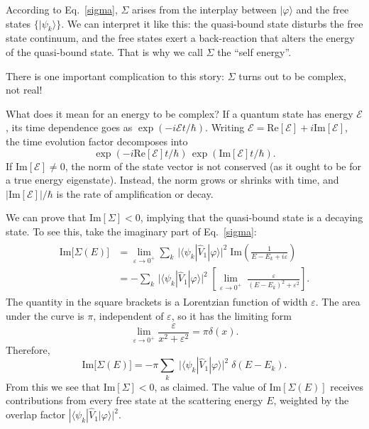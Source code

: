\documentclass[pra,12pt]{revtex4}
\begin{document}
According to Eq.~\eqref{sigma}, $\Sigma$ arises from the interplay
between $|\varphi\rangle$ and the free states $\{|\psi_k\rangle\}$.
We can interpret it like this: the quasi-bound state disturbs the free
state continuum, and the free states exert a back-reaction that alters
the energy of the quasi-bound state.  That is why we call $\Sigma$ the
``self energy''.

There is one important complication to this story: $\Sigma$ turns out
to be complex, not real!

What does it mean for an energy to be complex?  If a quantum state has
energy $\mathcal{E}$, its time dependence goes as $\exp(-i\mathcal{E}
t/\hbar)$.  Writing $\mathcal{E} = \mathrm{Re}[\mathcal{E}] + i
\mathrm{Im}[\mathcal{E}]$, the time evolution factor decomposes into
\begin{equation*}
  \exp(-i\mathrm{Re}[\mathcal{E}] t/\hbar) \,\exp(\mathrm{Im}[\mathcal{E}] t/\hbar).
\end{equation*}
If $\mathrm{Im}[\mathcal{E}] \ne 0$, the norm of the state vector is
not conserved (as it ought to be for a true energy eigenstate).
Instead, the norm grows or shrinks with time, and
$\big|\mathrm{Im}[\mathcal{E}]\big|/\hbar$ is the rate of
amplification or decay.

We can prove that $\mathrm{Im}[\Sigma] < 0$, implying that the
quasi-bound state is a decaying state.  To see this, take the
imaginary part of Eq.~\eqref{sigma}:
\begin{align}
  \begin{aligned}\mathrm{Im}\big[\Sigma(E)\big] &= \lim_{\varepsilon\rightarrow0^+} \sum_k\, \Big| \langle\psi_k| \hat{V}_1|\varphi\rangle\Big|^2 \; \mathrm{Im}\left( \frac{1}{\displaystyle E-E_k+i\varepsilon}\right) \\ &= - \sum_k\, \Big| \langle\psi_k| \hat{V}_1|\varphi\rangle\Big|^2 \; \left[ \lim_{\varepsilon\rightarrow0^+} \; \frac{\varepsilon}{\displaystyle (E-E_k)^2 + \varepsilon^2}\right].\end{aligned}
\end{align}
The quantity in the square brackets is a Lorentzian function of
width $\varepsilon$.  The area under the curve is $\pi$, independent
of $\varepsilon$, so it has the limiting form
\begin{equation}
  \lim_{\varepsilon\rightarrow 0^+} \frac{\varepsilon}{x^2+\varepsilon^2} = \pi\delta(x).
\end{equation}
Therefore,
\begin{equation}
  \mathrm{Im}\big[\Sigma(E)\big]
  = - \pi \sum_k \; \big| \langle\psi_k| \hat{V}_1|\varphi\rangle\big|^2
  \; \delta(E-E_k).
  \label{fermigr1}
\end{equation}
From this we see that $\mathrm{Im}[\Sigma] < 0$, as claimed.  The
value of $\mathrm{Im}[\Sigma(E)]$ receives contributions from every
free state at the scattering energy $E$, weighted by the overlap
factor $| \langle\psi_k| \hat{V}_1|\varphi\rangle|^2$.
\end{document}
